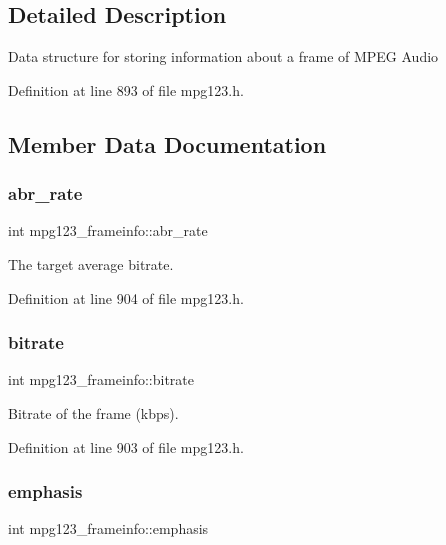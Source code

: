 \subsection{Detailed Description}
Data structure for storing information about a frame of M\+P\+EG Audio 

Definition at line 893 of file mpg123.\+h.



\subsection{Member Data Documentation}
\mbox{\label{structmpg123__frameinfo_aefb56c909ed7297d4b78aebdb478995a}} 
\subsubsection{\texorpdfstring{abr\_rate}{abr\_rate}}
{\footnotesize\ttfamily int mpg123\+\_\+frameinfo\+::abr\+\_\+rate}

The target average bitrate. 

Definition at line 904 of file mpg123.\+h.

\mbox{\label{structmpg123__frameinfo_ac8bfd092c3c98ba1e97111709c036a4e}} 
\subsubsection{\texorpdfstring{bitrate}{bitrate}}
{\footnotesize\ttfamily int mpg123\+\_\+frameinfo\+::bitrate}

Bitrate of the frame (kbps). 

Definition at line 903 of file mpg123.\+h.

\mbox{\label{structmpg123__frameinfo_a7b3a682d1c80446b4a01b9f6b6f8b470}} 
\subsubsection{\texorpdfstring{emphasis}{emphasis}}
{\footnotesize\ttfamily int mpg123\+\_\+frameinfo\+::emphasis}

